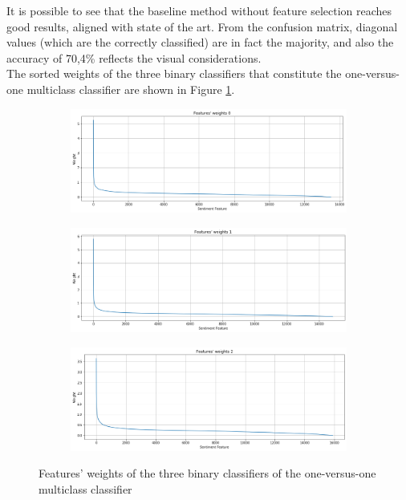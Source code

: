 It is possible to see that the baseline method without feature selection reaches good results, aligned with state of the art. From the confusion matrix, diagonal values (which are the correctly classified) are in fact the majority, and also the accuracy of 70,4\% reflects the visual considerations.\\
The sorted weights of the three binary classifiers that constitute the one-versus-one multiclass classifier are shown in Figure \ref{fig:svm-fs}.


\begin{figure}[H]
	\centering
	\begin{subfigure}{1\textwidth} %
		\includegraphics[width=\textwidth]{figures/conf_matrices/twitter_snt_svm/svm_fs_1.png}
	\end{subfigure}
	\begin{subfigure}{1\textwidth} %
		\includegraphics[width=\textwidth]{figures/conf_matrices/twitter_snt_svm/svm_fs_2.png}
	\end{subfigure}
	\begin{subfigure}{1\textwidth} %
		\includegraphics[width=\textwidth]{figures/conf_matrices/twitter_snt_svm/svm_fs_3.png}
	\end{subfigure}
	\caption{Features' weights of the three binary classifiers of the one-versus-one multiclass classifier} %
	\label{fig:svm-fs}
\end{figure}

